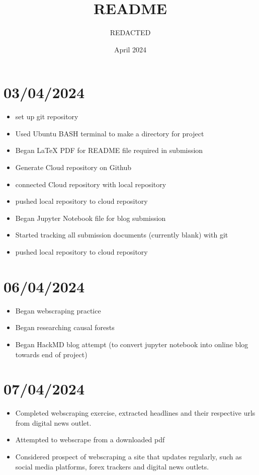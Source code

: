 \documentclass{article}
\title{README}
\author{REDACTED}
\date{April 2024}
\begin{document}
\maketitle

\section{03/04/2024}
\begin{itemize}
    \item set up git repository
    \item Used Ubuntu BASH terminal to make a directory for project
    \item Began LaTeX PDF for README file required in submission
    \item Generate Cloud repository on Github 
    \item connected Cloud repository with local repository
    \item pushed local repository to cloud repository
    \item Began Jupyter Notebook file for blog submission
    \item Started tracking all submission documents (currently blank) with git
    \item pushed local repository to cloud repository
\end{itemize}

\section{06/04/2024}
\begin{itemize}
    \item Began webscraping practice
    \item Began researching causal forests
    \item Began HackMD blog attempt (to convert jupyter notebook into online blog towards end of project)
\end{itemize}

\section{07/04/2024}
\begin{itemize}
    \item Completed webscraping exercise, extracted headlines and their respective urls from digital news outlet.
    \item Attempted to webscrape from a downloaded pdf
    \item Considered prospect of webscraping a site that updates regularly, such as social media platforms, forex trackers and digital news outlets.
\end{itemize}
\end{document}
